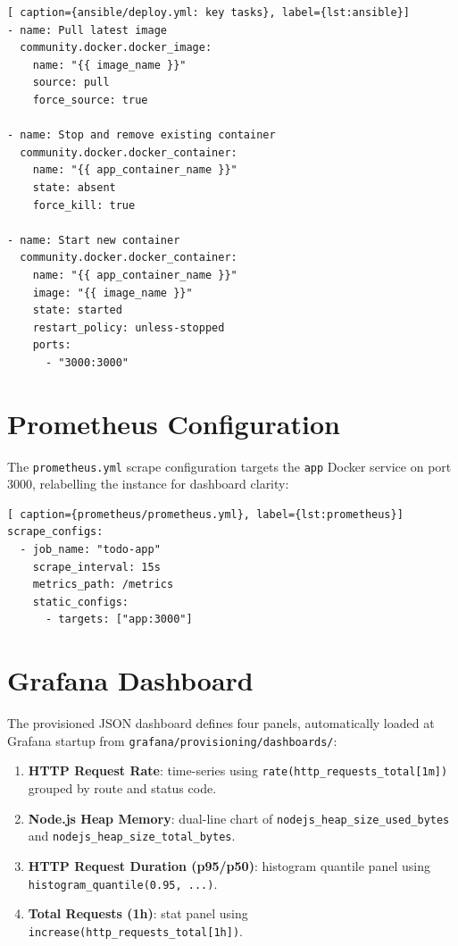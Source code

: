 \documentclass[12pt,a4paper]{report}
\begin{document}
\begin{lstlisting}[ caption={ansible/deploy.yml: key tasks}, label={lst:ansible}]
- name: Pull latest image
  community.docker.docker_image:
    name: "{{ image_name }}"
    source: pull
    force_source: true

- name: Stop and remove existing container
  community.docker.docker_container:
    name: "{{ app_container_name }}"
    state: absent
    force_kill: true

- name: Start new container
  community.docker.docker_container:
    name: "{{ app_container_name }}"
    image: "{{ image_name }}"
    state: started
    restart_policy: unless-stopped
    ports:
      - "3000:3000"
\end{lstlisting}

\section{Prometheus Configuration}
The \texttt{prometheus.yml} scrape configuration targets the \texttt{app} Docker service on port 3000, relabelling the instance for dashboard clarity:

\begin{lstlisting}[ caption={prometheus/prometheus.yml}, label={lst:prometheus}]
scrape_configs:
  - job_name: "todo-app"
    scrape_interval: 15s
    metrics_path: /metrics
    static_configs:
      - targets: ["app:3000"]
\end{lstlisting}

\section{Grafana Dashboard}
The provisioned JSON dashboard defines four panels, automatically loaded at Grafana startup from \texttt{grafana/provisioning/dashboards/}:
\begin{enumerate}
    \item \textbf{HTTP Request Rate}: time-series using \texttt{rate(http\_requests\_total[1m])} grouped by route and status code.
    \item \textbf{Node.js Heap Memory}: dual-line chart of \texttt{nodejs\_heap\_size\_used\_bytes} and \texttt{nodejs\_heap\_size\_total\_bytes}.
    \item \textbf{HTTP Request Duration (p95/p50)}: histogram quantile panel using \texttt{histogram\_quantile(0.95, ...)}.
    \item \textbf{Total Requests (1h)}: stat panel using \texttt{increase(http\_requests\_total[1h])}.
\end{enumerate}
\end{document}
